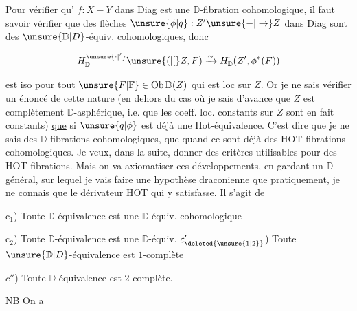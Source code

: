 
Pour vérifier qu' $f:X-Y$ dans Diag est une $\mathbb D$-fibration cohomologique, il faut
savoir vérifier que des flèches $\unsure{\phi|q}:Z'\unsure{\mathord{-}|\to}Z$ dans Diag sont des $\unsure{\mathbb D|D}$-équiv. cohomologiques, donc  

\[H^{\unsure{\cdot|'}}_{\mathbb D}\unsure{(|[}Z,F)\xrightarrow{\sim}H^{\cdot}_{\mathbb D}(Z',\phi^*(F))\]

est iso pour tout $\unsure{F|\mathbb F}\in\operatorname{Ob}\mathbb D(Z)$ qui est loc  sur $Z$. Or je ne sais vérifier un énoncé de cette nature (en dehors du cas où je sais d'avance que $Z$ est complètement $\mathbb D$-asphérique, i.e. que les coeff. loc. constants sur $Z$ sont en fait constants) \uline{que} si $\unsure{q|\phi}$ est déjà une Hot-équivalence. C'est dire que je ne sais   des $\mathbb D$-fibrations cohomologiques, que quand ce sont déjà des HOT-fibrations cohomologiques. Je veux, dans la suite, donner des critères utilisables pour des HOT-fibrations. Mais on va axiomatiser  ces développements, en gardant un $\mathbb D$ général, sur lequel je vais faire une hypothèse  draconienne que pratiquement, je ne connais que le dérivateur HOT qui y satisfasse. Il s'agit de  

 c$_1$) Toute $\mathbb D$-équivalence est une $\mathbb D$-équiv. cohomologique

c$_2$) Toute $\mathbb D$-équivalence est une $\mathbb D$-équiv. 
$c_{\deleted{\unsure{1|2}}}'$) Toute $\unsure{\mathbb D|D}$-équivalence est  $1$-complète

$c''$) Toute $\mathbb D$-équivalence est $2$-complète.

\uline{NB} On a



